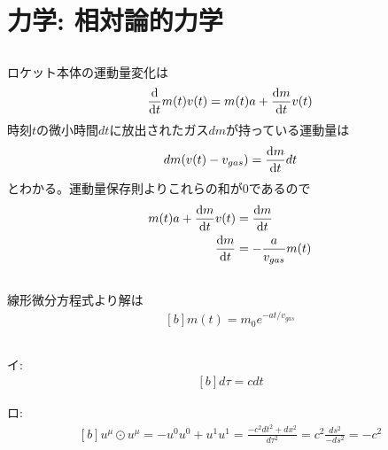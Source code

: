 \documentclass[../../sp_2015.tex]{subfiles}
\begin{document}
\section{力学: 相対論的力学}
\subsection{}
ロケット本体の運動量変化は
\begin{equation}\begin{aligned}[b]
    \dv{t}m(t)v(t) = m(t)a+\dv{m}{t}v(t)
\end{aligned}\end{equation}
時刻\(t\)の微小時間\(dt\)に放出されたガス\(dm\)が持っている運動量は
\begin{equation}\begin{aligned}[b]
    dm(v(t)-v_{gas}) = \dv{m}{t}(v(t)-v_{gas}) dt
\end{aligned}\end{equation}
とわかる。運動量保存則よりこれらの和が\(0\)であるので
\begin{equation}\begin{aligned}[b]
    m(t)a+\dv{m}{t}v(t) &= \dv{m}{t}(v(t)-v_{gas})\\
    \dv{m}{t} &= -\frac{a}{v_{gas}}m(t)
\end{aligned}\end{equation}

\subsection{}
線形微分方程式より解は
\begin{equation}\begin{aligned}[b]
    m(t) = m_0e^{-at/v_{gas}}
\end{aligned}\end{equation}

\subsection{}
イ:
\begin{equation}\begin{aligned}[b]
     d\tau = cdt
\end{aligned}\end{equation}

ロ:
\begin{equation}\begin{aligned}[b]
    u^\mu\odot u^\mu=-u^0u^0 + u^1u^1 = \frac{-c^2dt^2+dx^2}{d\tau^2} = c^2\frac{ds^2}{-ds^2}= -c^2
\end{aligned}\end{equation}
\end{document}
